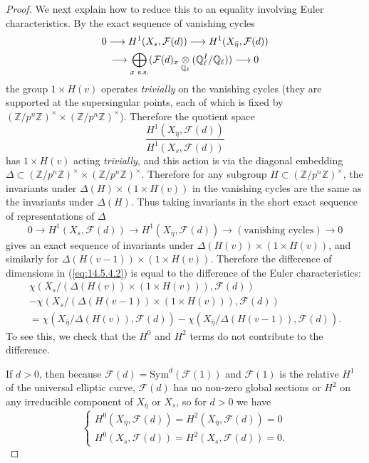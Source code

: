 \begin{proof}
\kmitem\label{item:14.5.5} We next explain how to reduce this to an equality involving Euler characteristics. By the exact sequence of vanishing cycles
\begin{multline*}
0 \longrightarrow H^1(X_s, \mathcal{F}(d)) \longrightarrow H^1(X_{\bar{\eta}}, \mathcal{F}(d)) \\
\longrightarrow \bigoplus_{x\ \mathrm{s.s.}} (\mathcal{F}(d)_x \underset{\mathbb{Q}_\ell}{\otimes} (\mathbb{Q}_\ell^I/\mathbb{Q}_\ell)) \longrightarrow 0
\end{multline*}
the group $1 \times H(v)$ operates \emph{trivially} on the vanishing cycles (they are supported at the supersingular points, each of which is fixed by $(\mathbb{Z}/p^n\mathbb{Z})^\times \times (\mathbb{Z}/p^n\mathbb{Z})^\times$). Therefore the quotient space
\begin{equation}\label{eq:14.5.5.1}
\frac{H^1(X_{\bar{\eta}}, \mathcal{F}(d))}{H^1(X_s, \mathcal{F}(d))}
\end{equation}
has $1 \times H(v)$ acting \emph{trivially}, and this action is via the diagonal embedding $\Delta \subset (\mathbb{Z}/p^n\mathbb{Z})^\times \times (\mathbb{Z}/p^n\mathbb{Z})^\times$. Therefore for any subgroup $H \subset (\mathbb{Z}/p^n\mathbb{Z})^\times$, the invariants under $\Delta(H) \times (1 \times H(v))$ in the vanishing cycles are the same as the invariants under $\Delta(H)$. Thus taking invariants in the short exact sequence of representations of $\Delta$
\begin{equation}\label{eq:14.5.5.2}
0 \to H^1(X_s, \mathcal{F}(d)) \to H^1(X_{\bar{\eta}}, \mathcal{F}(d)) \to (\text{vanishing cycles}) \to 0
\end{equation}
gives an exact sequence of invariants under $\Delta(H(v)) \times (1 \times H(v))$, and similarly for $\Delta(H(v-1)) \times (1 \times H(v))$. Therefore the difference of dimensions in (\ref{eq:14.5.4.2}) is equal to the difference of the Euler characteristics:
\begin{multline}\label{eq:14.5.5.3}
\chi(X_s / (\Delta(H(v)) \times (1 \times H(v))), \mathcal{F}(d)) \\
- \chi(X_s / (\Delta(H(v-1)) \times (1 \times H(v))), \mathcal{F}(d)) \\
= \chi(X_{\bar{\eta}} / \Delta(H(v)), \mathcal{F}(d)) - \chi(X_{\bar{\eta}} / \Delta(H(v-1)), \mathcal{F}(d)) .
\end{multline}
To see this, we check that the $H^0$ and $H^2$ terms do not contribute to the difference.

If $d > 0$, then because $\mathcal{F}(d) = \mathrm{Sym}^d(\mathcal{F}(1))$ and $\mathcal{F}(1)$ is the relative $H^1$ of the universal elliptic curve, $\mathcal{F}(d)$ has no non-zero global sections or $H^2$ on any irreducible component of $X_{\bar{\eta}}$ or $X_s$, so for $d > 0$ we have
\begin{equation}\label{eq:14.5.5.4}
\begin{cases}
H^0(X_{\bar{\eta}}, \mathcal{F}(d)) = H^2(X_{\bar{\eta}}, \mathcal{F}(d)) = 0 \\[4pt]
H^0(X_s, \mathcal{F}(d)) = H^2(X_s, \mathcal{F}(d)) = 0 .
\end{cases}
\end{equation}


\end{proof}
